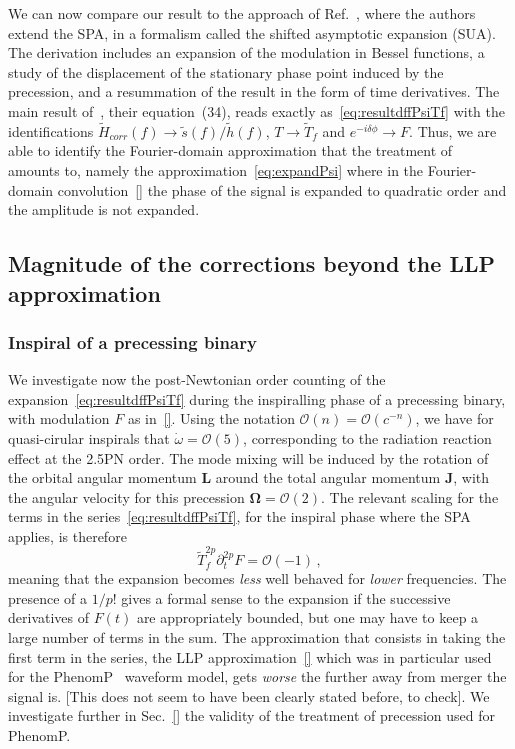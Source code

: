 \documentclass[aps,showpacs,%
prd,superscriptaddress,nofootinbib]{revtex4}
\newcommand{\be}{\begin{equation}}
\newcommand{\ee}{\end{equation}}
\newcommand\calO{{\mathcal{O}}}
\newcommand{\Tf}{\tilde{T}_{f}}
\begin{document}
We can now compare our result to the approach of Ref.~\cite{}, where the authors extend the SPA, in a formalism called the shifted asymptotic expansion (SUA). The derivation includes an expansion of the modulation in Bessel functions, a study of the displacement of the stationary phase point induced by the precession, and a resummation of the result in the form of time derivatives. The main result of~\cite{}, their equation~(34), reads exactly as~\eqref{eq:resultdffPsiTf} with the identifications $\tilde{H}_{corr}(f)\rightarrow \tilde{s}(f)/\tilde{h}(f)$, $T\rightarrow \Tf$ and $e^{-i\delta\phi} \rightarrow F$. Thus, we are able to identify the Fourier-domain approximation that the treatment of~\cite{} amounts to, namely the approximation~\eqref{eq:expandPsi} where in the Fourier-domain convolution~\eqref{} the phase of the signal is expanded to quadratic order and the amplitude is not expanded.


\subsection{Magnitude of the corrections beyond the LLP approximation}
\label{subsec:sizecorr}

\subsubsection{Inspiral of a precessing binary}
\label{subsubsec:sizecorrprecession}

We investigate now the post-Newtonian order counting of the expansion~\eqref{eq:resultdffPsiTf} during the inspiralling phase of a precessing binary, with modulation $F$ as in~\eqref{}. Using the notation $\calO(n) = \calO(c^{-n})$, we have for quasi-cirular inspirals that $\dot{\omega} = \calO(5)$, corresponding to the radiation reaction effect at the 2.5PN order. The mode mixing will be induced by the rotation of the orbital angular momentum $\bm{L}$ around the total angular momentum $\bm{J}$, with the angular velocity for this precession $\bm{\Omega} = \calO(2)$. The relevant scaling for the terms in the series~\eqref{eq:resultdffPsiTf}, for the inspiral phase where the SPA applies, is therefore
%
\be
	\Tf^{2p} \partial_{t}^{2p} F = \calO(-1) \,,
\ee
%
meaning that the expansion becomes {\it less} well behaved for {\it lower} frequencies. The presence of a $1/p!$ gives a formal sense to the expansion if the successive derivatives of $F(t)$ are appropriately bounded, but one may have to keep a large number of terms in the sum. The approximation that consists in taking the first term in the series, the LLP approximation~\eqref{} which was in particular used for the PhenomP~\cite{} waveform model, gets {\it worse} the further away from merger the signal is. [This does not seem to have been clearly stated before, to check]. We investigate further in Sec.~\ref{} the validity of the treatment of precession used for PhenomP.
\end{document}
